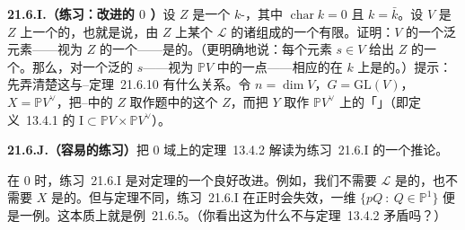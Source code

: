 \textbf{21.6.I.（练习：改进的\trCharacteristic{} $0$ \trBertini）}\quad 设 $Z$ 是一个\trSmooth{} $k$-\trVariety，其中 $\operatorname{char}k=0$ 且 $k=\bar{k}$。设 $V$ 是 $Z$ 上一个\trFiniteDimensional{}的\trBasePointFree\trLinearSystem，也就是说，由 $Z$ 上某个\trInvertibleSheaf{} $\mathscr{L}$ 的诸\trSection{}组成的一个有限\trVectorSpace。证明：$V$ 的一个泛元素——视为 $Z$ 的一个\trClosedSubscheme——是\trRegular{}的。（更明确地说：每个元素 $s\in V$ 给出 $Z$ 的一个\trClosedSubscheme。那么，对一个泛的 $s$——视为 $\mathbb{P}V$ 中的一点——相应的\trClosedSubscheme{}在 $k$ 上是\trSmooth{}的。）提示：先弄清楚这与\mbox{\trKleiman--\trBertini{}定理~21.6.10} 有什么关系。令 $n=\dim V$，$G=\mathrm{GL}(V)$，$X=\mathbb{P}V^{\vee}$，把\trKleiman--\trBertini{}中的 $Z$ 取作题中的这个 $Z$，而把 $Y$ 取作 $\mathbb{P}V^{\vee}$ 上的「\trUniversalHyperplane」（即\mbox{定义~13.4.1} 的\trIncidenceVariety{} $\mathrm{I}\subset\mathbb{P}V\times\mathbb{P}V^{\vee}$）。

\textbf{21.6.J.（容易的练习）}\quad 把\trCharacteristic{} $0$ 域上的\mbox{\trBertini{}定理~13.4.2} 解读为\mbox{练习~21.6.I} 的一个推论。

在\trCharacteristic{} $0$ 时，\mbox{练习~21.6.I} 是对\trBertini{}定理的一个良好改进。例如，我们不需要 $\mathscr{L}$ 是\trVeryAmple{}的，也不需要 $X$ 是\trProjective{}的。但与\trBertini{}定理不同，\mbox{练习~21.6.I} 在正\trCharacteristic{}时会失效，一维\trLinearSystem{} $\{pQ\ :\ Q\in\mathbb{P}^1\}$ 便是一例。这本质上就是\mbox{例~21.6.5}。（你看出这为什么不与\mbox{\trBertini{}定理~13.4.2} 矛盾吗？）
